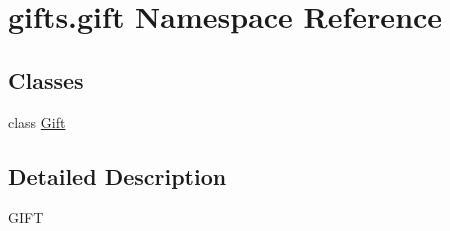 \hypertarget{namespacegifts_1_1gift}{}\section{gifts.\+gift Namespace Reference}
\label{namespacegifts_1_1gift}
\subsection*{Classes}
\begin{DoxyCompactItemize}
\item 
class \hyperlink{classgifts_1_1gift_1_1_gift}{Gift}
\end{DoxyCompactItemize}


\subsection{Detailed Description}
\begin{DoxyVerb}GIFT\end{DoxyVerb}
 